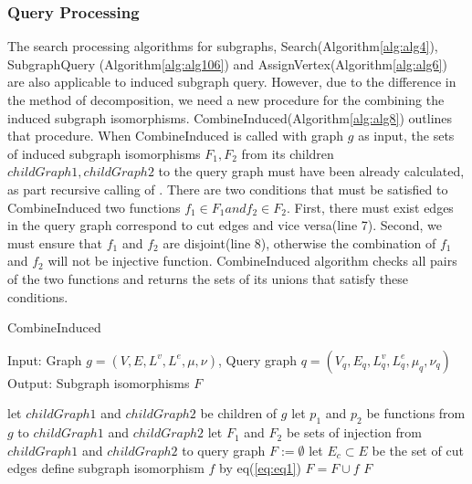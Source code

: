 \subsubsection{Query Processing}
The search processing algorithms for subgraphs, Search(Algorithm\ref{alg:alg4}), SubgraphQuery (Algorithm\ref{alg:alg106}) and AssignVertex(Algorithm\ref{alg:alg6}) 
are also applicable to induced subgraph query. However, due to the difference in the method of decomposition, we need a new procedure for the combining the 
induced subgraph isomorphisms. CombineInduced(Algorithm\ref{alg:alg8}) outlines that procedure.
When CombineInduced is called with graph $g$ as input, the sets of induced subgraph isomorphisms $F_1, F_2$ from its children $childGraph1, childGraph2$ 
to the query graph must have been already calculated, as part recursive calling of \label{alg:alg106}.
There are two conditions that must be satisfied to CombineInduced two functions $f_1 \in F_1 and f_2 \in F_2$.
First, there must exist edges in the query graph correspond to cut edges and vice versa(line 7).
Second, we must ensure that $f_1$ and $f_2$ are disjoint(line 8), otherwise the combination of $f_1$ and $f_2$ will not be injective function.
CombineInduced algorithm checks all pairs of the two functions and returns the sets of its unions that satisfy these conditions.

\begin{algorithm}[t]
\caption{CombineInduced}
\label{alg:alg8}
\begin{algorithmic}
\STATE Input: Graph $g=(V,E,L^v ,L^e ,\mu,\nu)$, Query graph $q=(V_q,E_q,L_q^v ,L_q^e ,\mu_q,\nu_q)$ 
\STATE Output: Subgraph isomorphisms $F$
\end{algorithmic}
\begin{algorithmic}[1]
\STATE let $childGraph1$ and $childGraph2$ be children of $g$
\STATE let $p_1$ and $p_2$ be functions from $g$ to $childGraph1$ and $childGraph2$
\STATE let $F_1$ and $F_2$ be sets of injection from $childGraph1$ and $childGraph2$ to query graph
\STATE $F := \emptyset$
\STATE let $E_c \subset E$ be the set of cut edges
				\STATE define subgraph isomorphism $f$ by eq(\ref{eq:eq1})
				\STATE $F = F \cup f $
		\ENDIF
	\ENDIF
\ENDFOR
\RETURN $F$
\end{algorithmic}
\end{algorithm}

